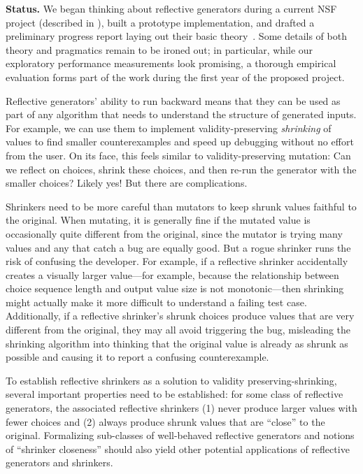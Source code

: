 \smallskip

{\bf Status.} We began thinking about reflective generators during a
current NSF project (described in ), built a
prototype implementation, and drafted a preliminary progress report
laying out their basic theory~\cite{Frohlich2022}. Some details of
both theory and pragmatics remain to be ironed out; in particular,
while our exploratory performance measurements look promising, a
thorough empirical evaluation forms part of the work during the first
year of the proposed project.


%
Reflective generators' ability to run backward means that they can be used as
part of any algorithm that needs to understand the structure of generated
inputs.  For example, we can use them to
implement validity-preserving {\em
shrinking} of values to find smaller counterexamples and speed up debugging
without no effort from the user. On its face, this feels similar to
validity-preserving mutation: Can we reflect on choices, shrink these
choices, and
then re-run the generator with the smaller choices? Likely yes! But there are
complications.

Shrinkers need to be more careful than mutators to keep shrunk values faithful
to the original. When mutating, it is generally fine if the mutated value is
occasionally quite different from the original, since the mutator is
trying many values and any that catch a bug are equally good. But a rogue
shrinker runs the risk of confusing the developer. For example, if a
reflective shrinker accidentally creates a visually larger
value---for example, because the relationship between choice sequence length and
output value size is not monotonic---then shrinking might actually make it more
difficult to understand a failing test case. Additionally, if a
reflective shrinker's shrunk choices
produce values that are very different from the original, they may all
avoid triggering the bug, misleading the shrinking algorithm into thinking that
the original value is already as shrunk as possible and causing it to
report a confusing counterexample.

To establish reflective shrinkers as a solution to
validity preserving-shrinking, several important
properties need to be established: for some class of reflective
generators, the associated reflective shrinkers (1) never produce larger values
with fewer choices and (2) always produce shrunk values that are ``close'' to
the original. Formalizing sub-classes of well-behaved reflective generators and
notions of ``shrinker closeness'' should also yield
other potential applications of reflective generators and shrinkers.

